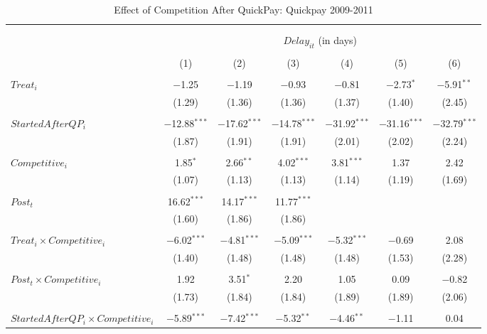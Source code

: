 \documentclass[
]{article}
\begin{document}
\begin{table}[H] \centering 
  \caption{Effect of Competition After QuickPay: Quickpay 2009-2011} 
  \label{} 
\small 
\begin{tabular}{@{\extracolsep{-3pt}}lcccccc} 
\\[-1.8ex]\hline 
\hline \\[-1.8ex] 
\\[-1.8ex] & \multicolumn{6}{c}{$Delay_{it}$ (in days)} \\ 
\\[-1.8ex] & (1) & (2) & (3) & (4) & (5) & (6)\\ 
\hline \\[-1.8ex] 
 $Treat_i$ & $-$1.25 & $-$1.19 & $-$0.93 & $-$0.81 & $-$2.73$^{*}$ & $-$5.91$^{**}$ \\ 
  & (1.29) & (1.36) & (1.36) & (1.37) & (1.40) & (2.45) \\ 
  & & & & & & \\ 
 $StartedAfterQP_i$ & $-$12.88$^{***}$ & $-$17.62$^{***}$ & $-$14.78$^{***}$ & $-$31.92$^{***}$ & $-$31.16$^{***}$ & $-$32.79$^{***}$ \\ 
  & (1.87) & (1.91) & (1.91) & (2.01) & (2.02) & (2.24) \\ 
  & & & & & & \\ 
 $Competitive_i$ & 1.85$^{*}$ & 2.66$^{**}$ & 4.02$^{***}$ & 3.81$^{***}$ & 1.37 & 2.42 \\ 
  & (1.07) & (1.13) & (1.13) & (1.14) & (1.19) & (1.69) \\ 
  & & & & & & \\ 
 $Post_t$ & 16.62$^{***}$ & 14.17$^{***}$ & 11.77$^{***}$ &  &  &  \\ 
  & (1.60) & (1.86) & (1.86) &  &  &  \\ 
  & & & & & & \\ 
 $Treat_i \times Competitive_i$ & $-$6.02$^{***}$ & $-$4.81$^{***}$ & $-$5.09$^{***}$ & $-$5.32$^{***}$ & $-$0.69 & 2.08 \\ 
  & (1.40) & (1.48) & (1.48) & (1.48) & (1.53) & (2.28) \\ 
  & & & & & & \\ 
 $Post_t \times Competitive_i$ & 1.92 & 3.51$^{*}$ & 2.20 & 1.05 & 0.09 & $-$0.82 \\ 
  & (1.73) & (1.84) & (1.84) & (1.89) & (1.89) & (2.06) \\ 
  & & & & & & \\ 
 $StartedAfterQP_i \times Competitive_i$ & $-$5.89$^{***}$ & $-$7.42$^{***}$ & $-$5.32$^{**}$ & $-$4.46$^{**}$ & $-$1.11 & 0.04 \\ 

\end{tabular}
\end{table}
\end{document}
